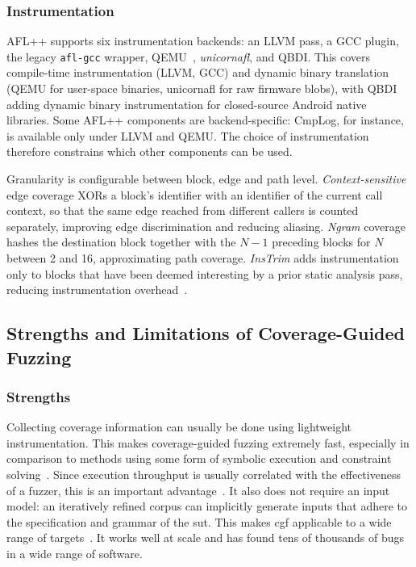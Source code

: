 \subsubsection{Instrumentation}

AFL++ supports six instrumentation backends: an LLVM pass, a GCC plugin, the legacy
\texttt{afl-gcc} wrapper, QEMU~\cite{bellard_qemu_2005}, \emph{unicornafl}, and QBDI.
This covers compile-time instrumentation (LLVM, GCC) and dynamic binary
translation (QEMU for user-space binaries, unicornafl for raw firmware blobs),
with QBDI adding dynamic binary instrumentation for closed-source Android
native libraries.
Some AFL++ components are backend-specific: CmpLog, for instance, is available only under LLVM and QEMU.
The choice of instrumentation therefore constrains which other components can be used.

Granularity is configurable between block, edge and path level.
\emph{Context-sensitive} edge coverage XORs a block's identifier with an identifier of the
current call context, so that the same edge reached from different callers is counted
separately, improving edge discrimination and reducing aliasing.
\emph{Ngram} coverage hashes the destination block together with the $N-1$ preceding blocks
for $N$ between 2 and 16, approximating path coverage.
\emph{InsTrim} adds instrumentation only to blocks that have been deemed interesting
by a prior static analysis pass, reducing instrumentation overhead~\cite{hsu2018instrim}.

\subsection{Strengths and Limitations of Coverage-Guided Fuzzing}\label{sec:fuzzing-limitations}

\subsubsection{Strengths}

Collecting coverage information can usually be done using lightweight instrumentation.
This makes coverage-guided fuzzing extremely fast, especially in comparison to
methods using some form of symbolic execution and constraint solving~\cite{godefroid_sage_2012,manes_art_2019}.
Since execution throughput is usually correlated with the effectiveness of a fuzzer,
this is an important advantage~\cite{fioraldi_afl_nodate,manes_art_2019}.
It also does not require an input model: an iteratively refined corpus can
implicitly generate inputs that adhere to the specification and grammar of the \gls{sut}.
This makes \gls{cgf} applicable to a wide range of targets~\cite{manes_art_2019}.
It works well at scale and has found tens of thousands of
bugs~\cite{arya_oss-fuzz_nodate} in a wide range of software.


